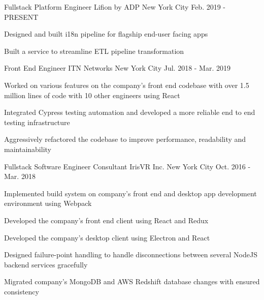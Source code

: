 

\begin{cventries}

  \cventry
    {Fullstack Platform Engineer} %
    {Lifion by ADP} %
    {New York City} %
    {Feb. 2019 - PRESENT} %
    {
      \begin{cvitems} %
        \item {Designed and built i18n pipeline for flagship end-user facing apps}
        \item {Built a service to streamline ETL pipeline transformation}
      \end{cvitems}
    }

  \cventry
    {Front End Engineer} %
    {ITN Networks} %
    {New York City} %
    {Jul. 2018 - Mar. 2019} %
    {
      \begin{cvitems} %
        \item {Worked on various features on the company's front end codebase with over 1.5 million lines of code with 10 other engineers using React}
        \item {Integrated Cypress testing automation and developed a more reliable end to end testing infrastructure} 
        \item {Aggressively refactored the codebase to improve performance, readability and maintainability} 
      \end{cvitems}
    }

  \cventry
    {Fullstack Software Engineer Consultant} %
    {IrisVR Inc.} %
    {New York City} %
    {Oct. 2016 - Mar. 2018} %
    {
      \begin{cvitems} %
        \item {Implemented build system on company's front end and desktop app development environment using Webpack}
        \item {Developed the company's front end client using React and Redux}
        \item {Developed the company's desktop client using Electron and React}
        \item {Designed failure-point handling to handle disconnections between several NodeJS backend services gracefully}
        \item {Migrated company's MongoDB and AWS Redshift database changes with ensured consistency}
      \end{cvitems}
    }


\end{cventries}
